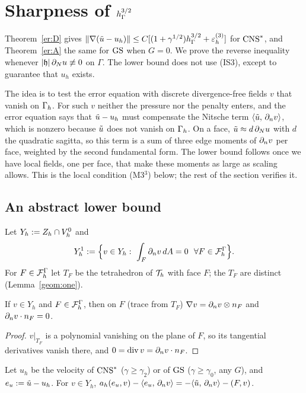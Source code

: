 \section{Sharpness of \texorpdfstring{$h_\Gamma^{3/2}$}{hG^{3/2}}}\label{sec:sharp}

Theorem~\ref{er:D} gives $\lVert \nabla(\tilde u-u_h)\rVert\le C[(1+\gamma^{1/2})h_\Gamma^{3/2}+\varepsilon_h^{(3)}]$ for $\mathrm{CNS}^\ast$, and Theorem~\ref{er:A} the same for $\mathrm{GS}$ when $G=0$. We prove the reverse inequality whenever $|\mathfrak h|\,\partial_Nu\not\equiv0$ on $\Gamma$. The lower bound does not use (IS3), except to guarantee that $u_h$ exists.

The idea is to test the error equation with discrete divergence-free fields $v$ that vanish on $\Gamma_h$. For such $v$ neither the pressure nor the penalty enters, and the error equation says that $\tilde u-u_h$ must compensate the Nitsche term $\langle \tilde u,\, \partial_n v\rangle$, which is nonzero because $\tilde u$ does not vanish on $\Gamma_h$. On a face, $\tilde u\approx d\,\partial_Nu$ with $d$ the quadratic sagitta, so this term is a sum of three edge moments of $\partial_n v$ per face, weighted by the second fundamental form. The lower bound follows once we have local fields, one per face, that make these moments as large as scaling allows. This is the local condition (M3$^3$) below; the rest of the section verifies it.

\subsection{An abstract lower bound}
Let $Y_h:=Z_h\cap V_h^0$ and
\[
Y_h^1:=\Bigl\{v\in Y_h:\ \int_F\dn v\,dA=0\ \ \forall F\in\FG\Bigr\}.
\]
For $F\in\mathcal F_h^\Gamma$ let $T_F$ be the tetrahedron of $\mathcal T_h$ with face $F$; the $T_F$ are distinct (Lemma~\ref{geom:one}).

\begin{lemma}\label{sh:normal}
If $v\in Y_h$ and $F\in\mathcal F_h^\Gamma$, then on $F$ (trace from $T_F$) $\nabla v=\partial_n v\otimes n_F$ and $\partial_n v\cdot n_F=0$.
\end{lemma}

\begin{proof}
$v|_{T_F}$ is a polynomial vanishing on the plane of $F$, so its tangential derivatives vanish there, and $0=\operatorname{div} v=\partial_n v\cdot n_F$.
\end{proof}

\begin{lemma}\label{sh:identity}
Let $u_h$ be the velocity of $\mathrm{CNS}^\ast$ ($\gamma\ge\gamma_2$) or of $\mathrm{GS}$ ($\gamma\ge\gamma_0$, any $G$), and $e_u:=\tilde u-u_h$. For $v\in Y_h$, $a_h(e_u,v)-\langle e_u,\, \partial_n v\rangle=-\langle \tilde u,\, \partial_n v\rangle-(F,v)$.
\end{lemma}

